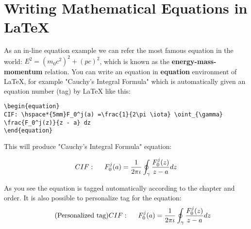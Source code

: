 \section{Writing Mathematical Equations in \LaTeX} %
\label{section 2.2}
As an in-line equation example we can refer the most famous equation in the world: $E^2 = (m_0c^2)^2 + (pc)^2$, which is known as the \textbf{energy-mass-momentum} relation. You can write an equation in \textbf{equation} environment of \LaTeX, for example "Cauchy's Integral Formula" which is automatically given an equation number (tag) by \LaTeX{} like this:
\begin{verbatim}
\begin{equation}
CIF: \hspace*{5mm}F_0^j(a) =\frac{1}{2\pi \iota} \oint_{\gamma} 
\frac{F_0^j(z)}{z - a} dz
\end{equation}
\end{verbatim}
This will produce "Cauchy's Integral Formula" equation:

\begin{equation}
CIF: \hspace*{5mm}F_0^j(a) = \frac{1}{2\pi \iota} \oint_{\gamma} \frac{F_0^j(z)}{z - a} dz
\end{equation}

As you see the equation is tagged automatically according to the chapter and order. It is also possible to personalize tag for the equation:
\begin{equation}
\centering
\tag{Personalized tag}
CIF: \hspace*{5mm}F_0^j(a) = \frac{1}{2\pi \iota} \oint_{\gamma} \frac{F_0^j(z)}{z - a} dz
\end{equation}

\nomenclature[G]{$\pi$}{ $\simeq 3.14\ldots$}                                             

